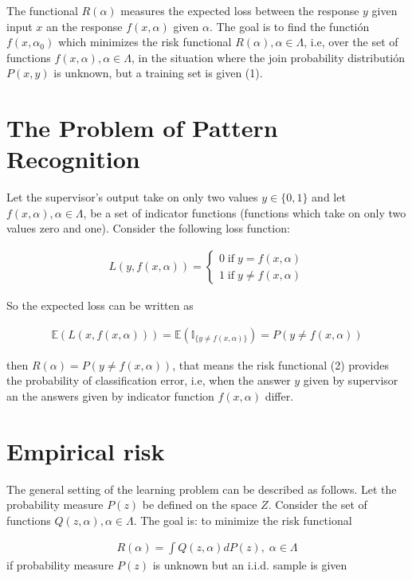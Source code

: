 \documentclass{article}
\begin{document}
The functional $R(\alpha)$ measures the expected loss between the response $y$ given input $x$ an the response $f(x,\alpha)$ given $\alpha$. The goal is to find the functión $f(x, \alpha_{0})$ which minimizes the risk functional $R(\alpha), \alpha \in \Lambda$, i.e, over the set of functions $f(x, \alpha), \alpha \in \Lambda$, in the situation where the join probability distributión $P(x,y)$ is unknown, but a training set is given (1).

\section{The Problem of Pattern Recognition}

Let the supervisor's output take on only two values $y\in\{0,1\}$ and let $f(x,\alpha), \alpha\in \Lambda$, be a set of indicator functions (functions which take on only two values zero and one). Consider the following loss function:

\begin{align}
L(y, f(x,\alpha)) = \begin{cases}
    0 \; \text{if} \;y=f(x,\alpha)\\
    1 \; \text{if} \;y\neq f(x,\alpha)
\end{cases} 
\end{align}

So the expected loss can be written as

\begin{align}
    \mathbb{E}(L(x, f(x,\alpha)))=\mathbb{E}(\mathbb{I}_{\{y\neq f(x,\alpha)\}})=P(y\neq f(x,\alpha))
\end{align}

then $R(\alpha) = P(y\neq f(x,\alpha))$, that means the risk functional (2) provides the probability of classification error, i.e, when the answer $y$ given by supervisor an the answers given by indicator function $f(x,\alpha)$ differ.

\section{Empirical risk}

The general setting of the learning problem can be described as follows. Let the probability measure $P(z)$ be defined on the space $Z$. Consider the set of functions $Q(z,\alpha), \alpha \in \Lambda$. The goal is: to minimize the risk functional 

\begin{align}
    R(\alpha) = \int Q(z,\alpha)dP(z), \; \alpha \in \Lambda
\end{align}
if probability measure $P(z)$ is unknown but an i.i.d. sample is given
\end{document}
